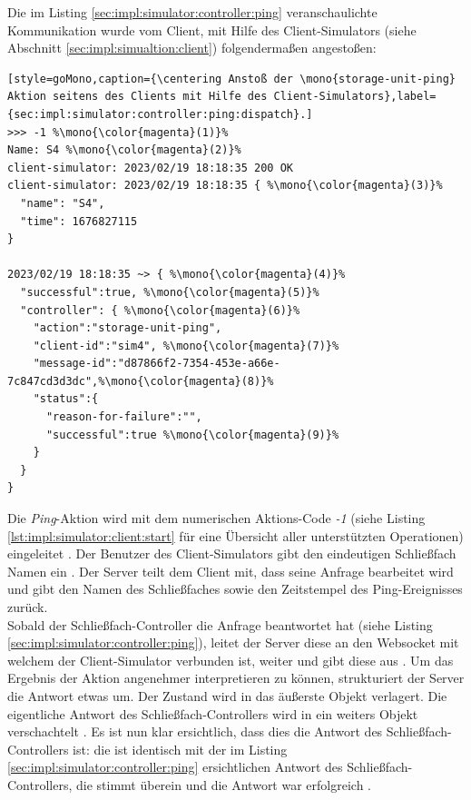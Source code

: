 \noindent
Die im Listing \ref{sec:impl:simulator:controller:ping} veranschaulichte Kommunikation wurde vom Client, mit Hilfe des Client-Simulators (siehe Abschnitt \ref{sec:impl:simualtion:client}) folgendermaßen angestoßen:
\begin{lstlisting}[style=goMono,caption={\centering Anstoß der \mono{storage-unit-ping} Aktion seitens des Clients mit Hilfe des Client-Simulators},label={sec:impl:simulator:controller:ping:dispatch}.]
>>> -1 %\mono{\color{magenta}(1)}%
Name: S4 %\mono{\color{magenta}(2)}%
client-simulator: 2023/02/19 18:18:35 200 OK
client-simulator: 2023/02/19 18:18:35 { %\mono{\color{magenta}(3)}%
  "name": "S4",
  "time": 1676827115
}

2023/02/19 18:18:35 ~> { %\mono{\color{magenta}(4)}%
  "successful":true, %\mono{\color{magenta}(5)}%
  "controller": { %\mono{\color{magenta}(6)}%
    "action":"storage-unit-ping", 
    "client-id":"sim4", %\mono{\color{magenta}(7)}%
    "message-id":"d87866f2-7354-453e-a66e-7c847cd3d3dc",%\mono{\color{magenta}(8)}%
    "status":{
      "reason-for-failure":"",
      "successful":true %\mono{\color{magenta}(9)}%
    }
  }
}
\end{lstlisting}
Die \textit{Ping}-Aktion wird mit dem numerischen Aktions-Code \textit{-1} (siehe Listing \ref{lst:impl:simulator:client:start} für eine Übersicht aller unterstützten Operationen) eingeleitet . Der Benutzer des Client-Simulators gibt den eindeutigen Schließfach Namen ein . Der Server teilt dem Client mit, dass seine Anfrage bearbeitet wird  und gibt den Namen des Schließfaches sowie den Zeitstempel des Ping-Ereignisses zurück.\\ Sobald der Schließfach-Controller die Anfrage beantwortet hat (siehe Listing \ref{sec:impl:simulator:controller:ping}), leitet der Server diese an den Websocket mit welchem der Client-Simulator verbunden ist, weiter und gibt diese aus . Um das Ergebnis der Aktion angenehmer interpretieren zu können, strukturiert der Server die Antwort etwas um. Der Zustand  wird in das äußerste Objekt verlagert. Die eigentliche Antwort des Schließfach-Controllers wird in ein weiters Objekt verschachtelt . Es ist nun klar ersichtlich, dass dies  die Antwort des Schließfach-Controllers  ist: die   ist identisch mit der im Listing \ref{sec:impl:simulator:controller:ping} ersichtlichen Antwort des Schließfach-Controllers, die   stimmt überein und die Antwort war erfolgreich .\smallskip

